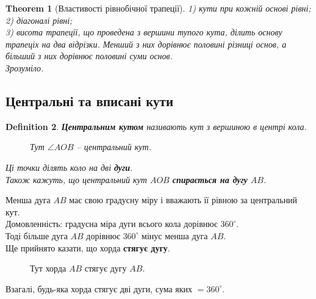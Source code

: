 \documentclass[a4paper, 10pt]{article}
\theoremstyle{theoremdd}
\newtheorem{theorem}{Theorem}[subsection]
\theoremstyle{theoremdd}
\theoremstyle{theoremdd}
\newtheorem{definition}[theorem]{Definition}
\theoremstyle{theoremdd}
\theoremstyle{theoremdd}
\theoremstyle{theoremdd}
\theoremstyle{theoremdd}
\theoremstyle{theoremdd}
\theoremstyle{theoremdd}
\begin{document}
\begin{theorem}[Властивості рівнобічної трапеції]
1) кути при кожній основі рівні;\\
2) діагоналі рівні;\\
3) висота трапеції, що проведена з вершини тупого кута, ділить основу трапеціх на два відрізки. Менший з них дорівнює половині різниці основ, а більший з них дорівнює половині суми основ.\\
\textit{Зрозуміло.}
\end{theorem}

\subsection{Центральні та вписані кути}
\begin{definition}
\textbf{Центральним кутом} називають кут з вершиною в центрі кола.
\begin{figure}[H]
\centering
{}
\caption*{Тут $\angle AOB$ -- центральний кут.}
\end{figure}
Ці точки ділять коло на дві \textbf{дуги}.\\
Також кажуть, що центральний кут $AOB$ \textbf{спирається на дугу} $AB$.
\end{definition}
Менша дуга $AB$ має свою градусну міру і вважають її рівною за центральний кут.\\
Домовленність: градусна міра дуги всього кола дорівнює $360^\circ$.\\
Тоді більше дуга $AB$ дорівнює $360^\circ$ мінус менша дуга $AB$.
\bigskip \\
Ще прийнято казати, що хорда \textbf{стягує дугу}.
\begin{figure}[H]
\centering
{}
\caption*{Тут хорда $AB$ стягує дугу $AB$.}
\end{figure}
Взагалі, будь-яка хорда стягує дві дуги, сума яких $=360^\circ$.
\end{document}
